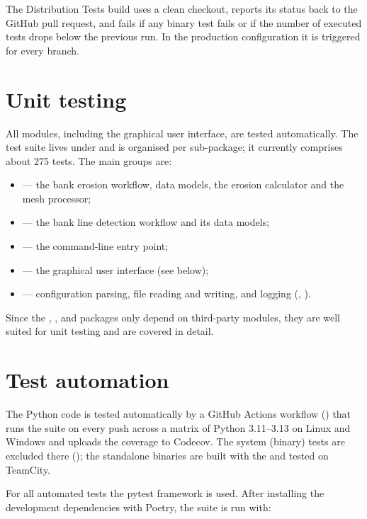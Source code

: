 The Distribution Tests build uses a clean checkout, reports its status back to the GitHub pull
request, and fails if any binary test fails or if the number of executed tests drops below the
previous run. In the production configuration it is triggered for every branch.


\section{Unit testing}

All modules, including the graphical user interface, are tested automatically. The test suite lives under  and is organised per sub-package; it currently comprises about 275 tests. The main groups are:

\begin{itemize}
\item {} --- the bank erosion workflow, data models, the erosion calculator and the mesh processor;
\item {} --- the bank line detection workflow and its data models;
\item {} --- the command-line entry point;
\item {} --- the graphical user interface (see below);
\item {} --- configuration parsing, file reading and writing, and logging (, ).
\end{itemize}

Since the , ,  and  packages only depend
on third-party modules, they are well suited for unit testing and are covered in detail.


\section{Test automation}

The Python code is tested automatically by a GitHub Actions workflow () that runs
the  suite on every push across a matrix of Python 3.11--3.13 on Linux and Windows and
uploads the coverage to Codecov. The system (binary) tests are excluded there (); the
standalone binaries are built with the  and tested on TeamCity.

For all automated tests the pytest framework is used. After installing the
development dependencies with Poetry, the suite is run with:

